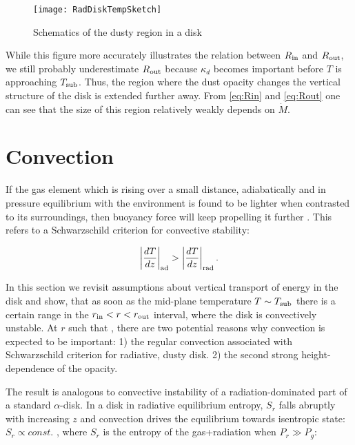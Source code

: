 \documentclass[12pt,english,preprint]{aastex}
\newcommand{\su}[2]{#1_{\rm #2}}
\newcommand{\Rout}{\su{R}{out}}
\newcommand{\Rin}{\su{R}{in}}
\newcommand{\Tc}{T}
\begin{document}
\begin{figure} 
\texttt{[image: RadDiskTempSketch]}\label{fig:DiskTcAndTeff1}
\caption{Schematics of the dusty region in a disk}
\end{figure}

While this figure more accurately illustrates the relation between
$\Rin$ and $\Rout$, we still probably underestimate $\Rout$
because $\kappa_d$ becomes important before $T$ is approaching
$T_{{\rm sub}}$. Thus, the region where the dust opacity changes the
vertical structure of the disk is extended further away. From
\eqref{eq:Rin} and \eqref{eq:Rout} one can see that the size of this
region relatively weakly depends on $\dot{M}$.

\section{Convection}

If the gas element which is rising over a small distance, adiabatically
and in pressure equilibrium with the environment is found to 
be lighter when contrasted to its surroundings, then
buoyancy force will keep propelling it further \citep{KippenhahnWeigert94}.
This refers to a Schwarzschild criterion for convective
stability:

\begin{equation}
\left|\frac{dT}{dz}\right|_{{\rm ad}}>\left|\frac{dT}{dz}\right|_{{\rm rad}}\mbox{.}\label{eq:SchwarzschildCrit}
\end{equation}


In this section we revisit assumptions about vertical transport of
energy in the disk 
and show, that as soon as the mid-plane 
temperature $\Tc \sim T_{{\rm sub}}$ there is a certain range in the
$r_{{\rm in}}<r<r_{{\rm out}}$ interval, where the disk is convectively unstable. At $r$ such that
, there are two potential reasons why
convection is expected to be important: 1) the regular convection
associated with Schwarzschild criterion for radiative, dusty disk. 2)
the second strong height-dependence of the opacity.


The result is analogous to convective instability of a radiation-dominated 
part of a standard $\alpha$-disk. 
In a disk in radiative equilibrium entropy, $S_r$ falls abruptly with increasing $z$ and
convection drives the equilibrium towards isentropic
state: $S_{r}\propto const.$ \citep{BKBlinn77}, where $S_{r}$ is
the entropy of the gas+radiation when $P_r\gg P_{g}$:
\end{document}
